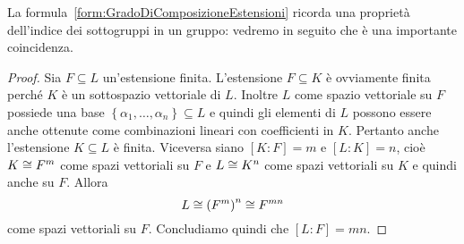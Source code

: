 La formula~\ref{form:GradoDiComposizioneEstensioni} ricorda una proprietà dell'indice dei sottogruppi in un gruppo: vedremo in seguito che è una importante coincidenza.

\begin{proof}
Sia \(F \subseteq L\) un'estensione finita. L'estensione \(F \subseteq K\) è ovviamente finita perché \(K\) è un sottospazio vettoriale di \(L\). Inoltre \(L\) come spazio vettoriale su \(F\) possiede una base \(\left\{ \alpha_1, \dots{}, \alpha_n \right\} \subseteq L\) e quindi gli elementi di \(L\) possono essere anche ottenute come combinazioni lineari con coefficienti in \(K\). Pertanto anche l'estensione \(K \subseteq L\) è finita.\newline
Viceversa  siano \([K:F]=m\) e \([L:K]=n\), cioè \(K \cong F^m\) come spazi vettoriali su \(F\) e \(L \cong K^n\) come spazi vettoriali su \(K\) e quindi anche su \(F\). Allora 
\[L \cong \left(F^m\right)^n\cong F^{mn}\] 
come spazi vettoriali su \(F\). Concludiamo quindi che \([L:F]=mn\).
\end{proof}





